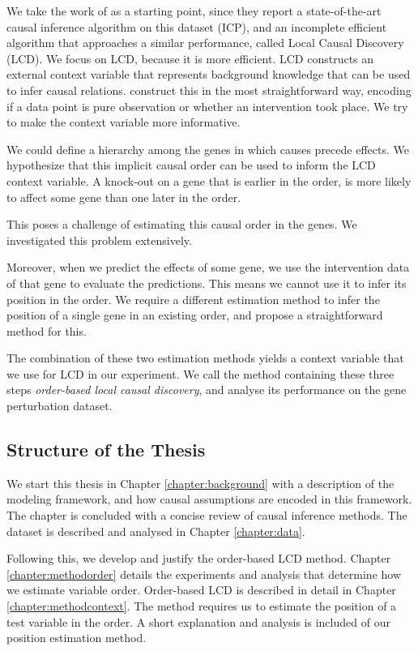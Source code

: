We take the work of \citet{versteeg2019boosting} as a starting point, since they report a state-of-the-art causal inference algorithm on this dataset (ICP), and an incomplete efficient algorithm that approaches a similar performance, called Local Causal Discovery (LCD). We focus on LCD, because it is more efficient. LCD constructs an external context variable that represents background knowledge that can be used to infer causal relations. \citet{versteeg2019boosting} construct this in the most straightforward way, encoding if a data point is pure observation or whether an intervention took place. We try to make the context variable more informative.

We could define a hierarchy among the genes in which causes precede effects. We hypothesize that this implicit causal order can be used to inform the LCD context variable. A knock-out on a gene that is earlier in the order, is more likely to affect some gene than one later in the order. 

This poses a challenge of estimating this causal order in the genes. We investigated this problem extensively. 

Moreover, when we predict the effects of some gene, we use the intervention data of that gene to evaluate the predictions. This means we cannot use it to infer its position in the order. We require a different estimation method to infer the position of a single gene in an existing order, and propose a straightforward method for this. 

The combination of these two estimation methods yields a context variable that we use for LCD in our experiment. We call the method containing these three steps \textit{order-based local causal discovery}, and analyse its performance on the gene perturbation dataset. 


\subsection{Structure of the Thesis}
We start this thesis in Chapter \ref{chapter:background} with a description of the modeling framework, and how causal assumptions are encoded in this framework. The chapter is concluded with a concise review of causal inference methods. The dataset is described and analysed in Chapter \ref{chapter:data}.

Following this, we develop and justify the order-based LCD method. Chapter \ref{chapter:methodorder} details the experiments and analysis that determine how we estimate variable order. Order-based LCD is described in detail in Chapter \ref{chapter:methodcontext}. The method requires us to estimate the position of a test variable in the order. A short explanation and analysis is included of our position estimation method. 

